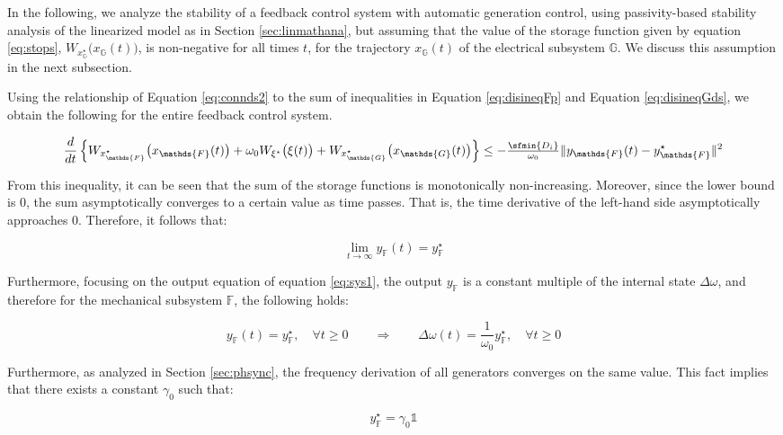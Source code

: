 \documentclass[graybox, envcountchap]{svmult}
\begin{document}
In the following, we analyze the stability of a feedback control system with
automatic generation control, using passivity-based stability analysis of the
linearized model as in Section \ref{sec:linmathana}, but assuming that the value
of the storage function given by equation \ref{eq:stops},
$W_{x^{\star}_{\mathds{G}}}\bigl(x_{\mathds{G}}(t) \bigr)$, is non-negative for
all times $t$, for the trajectory $x_{\mathds{G}}(t)$ of the electrical
subsystem $\mathds{G}$. We discuss this assumption in the next subsection.

Using the relationship of Equation \ref{eq:connds2} to the sum of inequalities
in Equation \ref{eq:disineqFp} and Equation \ref{eq:disineqGds}, we obtain the
following for the entire feedback control system.

\[
  \frac{d}{dt}  \left\{
  W_{x^{\star}_{\mathds{F}}}  \bigl( x_{\mathds{F}}(t) \bigr) 
  +
  \omega_0
  W_{\xi^{\star}} \bigl( \xi(t) \bigr) 
  +
  W_{x^{\star}_{\mathds{G}}} \bigl(x_{\mathds{G}}(t) \bigr)
  \right\} 
  \leq 
  - \tfrac{\sfmin \left\{ D_i \right\}}{\omega_0}
  \|y_{\mathds{F}}(t) -y^{\star}_{\mathds{F}}\|^2
\]

From this inequality, it can be seen that the sum of the storage functions is
monotonically non-increasing. Moreover, since the lower bound is 0, the sum
asymptotically converges to a certain value as time passes. That is, the time
derivative of the left-hand side asymptotically approaches 0. Therefore, it
follows that:

\[
  \lim_{t\rightarrow \infty}
  y_{\mathds{F}}(t) = y^{\star}_{\mathds{F}}
\]

Furthermore, focusing on the output equation of equation \ref{eq:sys1}, the
output $y_{\mathds{F}}$ is a constant multiple of the internal state $\Delta
\omega$, and therefore for the mechanical subsystem $\mathds{F}$, the following
holds: 

\begin{equation}\label{eq:Fobsnl}
y_{\mathds{F}}(t)  =y^{\star}_{\mathds{F}},\quad \forall t\geq 0 
\qquad \Longrightarrow \qquad
\Delta \omega(t)  =\frac{1}{\omega_0} y^{\star}_{\mathds{F}},\quad \forall t\geq 0 
\end{equation}

Furthermore, as analyzed in Section \ref{sec:phsync}, the frequency derivation
of all generators converges on the same value. This fact implies that there
exists a constant $\gamma_0$ such that:

\[
  y^{\star}_{\mathds{F}} = \gamma_0 \mathds{1}
\]
\end{document}
